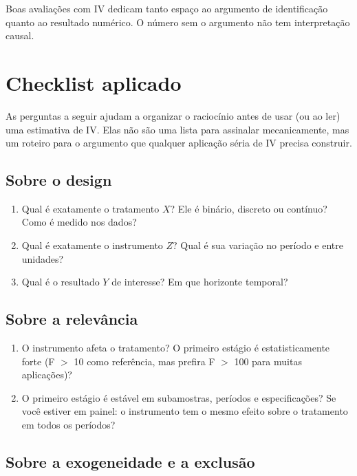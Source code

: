 Boas avaliações com IV dedicam tanto espaço ao argumento de identificação quanto ao resultado numérico. O número sem o argumento não tem interpretação causal.

\section{Checklist aplicado}
\label{sec:checklist}

As perguntas a seguir ajudam a organizar o raciocínio antes de usar (ou ao ler) uma estimativa de IV. Elas não são uma lista para assinalar mecanicamente, mas um roteiro para o argumento que qualquer aplicação séria de IV precisa construir.

\subsection*{Sobre o design}

\begin{enumerate}[leftmargin=*, label=\textbf{\arabic*.}]
  \item Qual é exatamente o tratamento $X$? Ele é binário, discreto ou contínuo? Como é medido nos dados?
  \item Qual é exatamente o instrumento $Z$? Qual é sua variação no período e entre unidades?
  \item Qual é o resultado $Y$ de interesse? Em que horizonte temporal?
\end{enumerate}

\subsection*{Sobre a relevância}

\begin{enumerate}[leftmargin=*, label=\textbf{\arabic*.}, start=4]
  \item O instrumento afeta o tratamento? O primeiro estágio é estatisticamente forte (F $>$ 10 como referência, mas prefira F $>$ 100 para muitas aplicações)?
  \item O primeiro estágio é estável em subamostras, períodos e especificações? Se você estiver em painel: o instrumento tem o mesmo efeito sobre o tratamento em todos os períodos?
\end{enumerate}

\subsection*{Sobre a exogeneidade e a exclusão}

